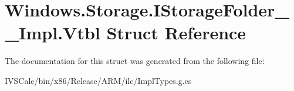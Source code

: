 \hypertarget{struct_windows_1_1_storage_1_1_i_storage_folder_____impl_1_1_vtbl}{}\section{Windows.\+Storage.\+I\+Storage\+Folder\+\_\+\+\_\+\+Impl.\+Vtbl Struct Reference}
\label{struct_windows_1_1_storage_1_1_i_storage_folder_____impl_1_1_vtbl}


The documentation for this struct was generated from the following file\+:\begin{DoxyCompactItemize}
\item 
I\+V\+S\+Calc/bin/x86/\+Release/\+A\+R\+M/ilc/Impl\+Types.\+g.\+cs\end{DoxyCompactItemize}
